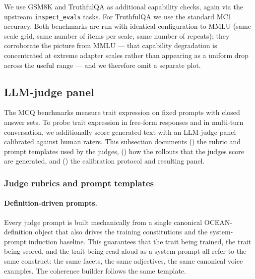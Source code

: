 We use GSM8K \citep{cobbe2021gsm8k} and TruthfulQA \citep{lin2022truthfulqa} as additional capability checks, again via the upstream \texttt{inspect\_evals} tasks. For TruthfulQA we use the standard MC1 accuracy. Both benchmarks are run with identical configuration to MMLU (same scale grid, same number of items per scale, same number of repeats); they corroborate the picture from MMLU --- that capability degradation is concentrated at extreme adapter scales rather than appearing as a uniform drop across the useful range --- and we therefore omit a separate plot.

\subsection{LLM-judge panel}\label{sec:appendix-e-judge}

The MCQ benchmarks measure trait expression on fixed prompts with closed answer sets. To probe trait expression in free-form responses and in multi-turn conversation, we additionally score generated text with an LLM-judge panel calibrated against human raters. This subsection documents () the rubric and prompt templates used by the judges, () how the rollouts that the judges score are generated, and () the calibration protocol and resulting panel.

\subsubsection{Judge rubrics and prompt templates}\label{sec:appendix-e-rubrics}

\paragraph{Definition-driven prompts.}
Every judge prompt is built mechanically from a single canonical OCEAN-definition object that also drives the training constitutions and the system-prompt induction baseline. This guarantees that the trait being trained, the trait being scored, and the trait being read aloud as a system prompt all refer to the same construct: the same facets, the same adjectives, the same canonical voice examples. The coherence builder follows the same template.

